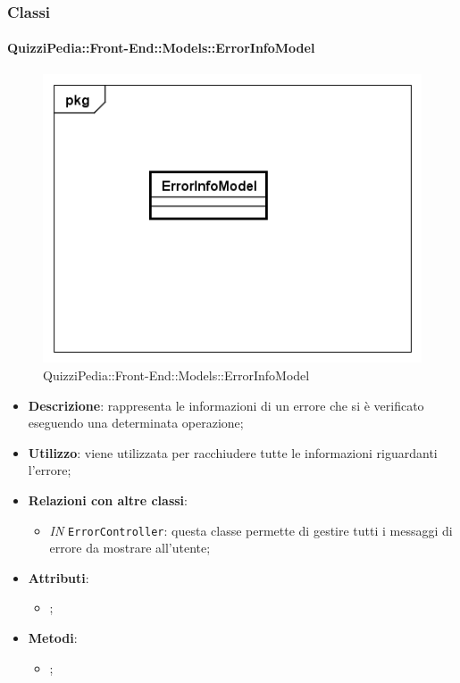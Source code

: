 	\subsubsection{Classi}
		\paragraph{QuizziPedia::Front-End::Models::ErrorInfoModel}
		
		\label{QuizziPedia::Front-End::Models::ErrorInfoModel}
		
		\begin{figure}[h]
			\centering
			\includegraphics[scale=0.5,keepaspectratio]{UML/Classi/Front-End/QuizziPedia_Front-end_Models_ErrorInfoModel.png}
			\caption{QuizziPedia::Front-End::Models::ErrorInfoModel}
		\end{figure}
		
		\begin{itemize}
			\item \textbf{Descrizione}: rappresenta le informazioni di un errore che si è verificato eseguendo una determinata operazione;
			\item \textbf{Utilizzo}: viene utilizzata per racchiudere tutte le informazioni riguardanti l’errore;
			\item \textbf{Relazioni con altre classi}: 
			\begin{itemize}
				\item \textit{IN} \texttt{ErrorController}: questa classe permette di gestire tutti i messaggi di errore da mostrare all'utente; 
			\end{itemize}
			\item \textbf{Attributi}: 
			\begin{itemize}
				\item ;
			\end{itemize}
			\item \textbf{Metodi}: 
			\begin{itemize}
				\item ;
			\end{itemize}
		\end{itemize}
			

